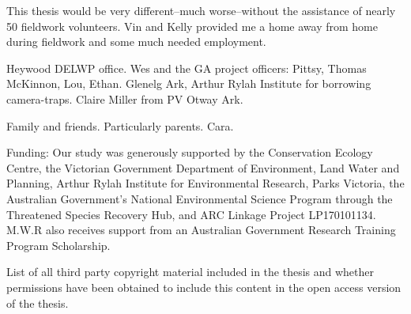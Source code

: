 \documentclass[11pt,a4paper,titlepage,twoside,openright]{style/unimelbthesis}
\begin{document}
\begin{frontmatter}
\begin{acknowledgements}
    This thesis would be very different--much worse--without the assistance of nearly 50 fieldwork volunteers.
    Vin and Kelly provided me a home away from home during fieldwork and some much needed employment.
    
    Heywood DELWP office. Wes and the GA project officers: Pittsy, Thomas McKinnon, Lou, Ethan.
    Glenelg Ark, Arthur Rylah Institute for borrowing camera-traps.
    Claire Miller from PV Otway Ark.
    
    Family and friends. Particularly parents. Cara.
    
    Funding:
    Our study was generously supported by the Conservation Ecology Centre, the Victorian Government Department of Environment, Land Water and Planning, Arthur Rylah Institute for Environmental Research, Parks Victoria, the Australian Government's National Environmental Science Program through the Threatened Species Recovery Hub, and ARC Linkage Project LP170101134. M.W.R also receives support from an Australian Government Research Training Program Scholarship.
  \end{acknowledgements}

  \hypersetup{linkcolor=black}
  \setcounter{tocdepth}{2}
  \tableofcontents


  \listoftables


  \listoffigures

\begin{copyrightlist}
  List of all third party copyright material included in the thesis and whether
  permissions have been obtained to include this content in the open access
  version of the thesis.
\end{copyrightlist}
\end{frontmatter}
%
\end{document}
